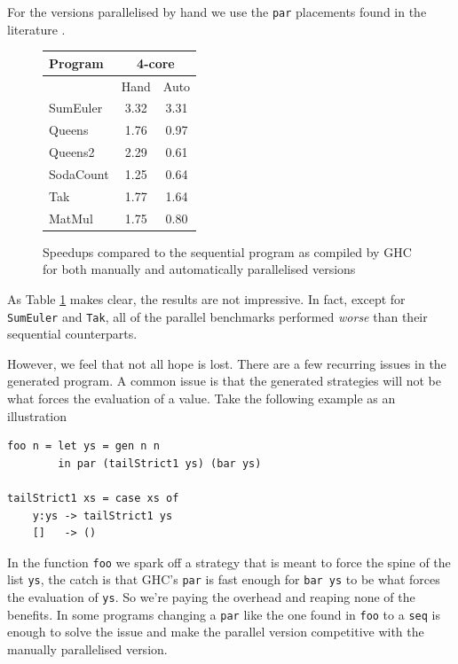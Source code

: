 For the versions parallelised by hand we use the \verb-par- placements found
in the literature \citep{vGMachine, runciman1994profiling}.

\begin{figure}[ht]
\centering
  \begin{tabular}{ |l||c c| }
    \hline
    Program & \multicolumn{2}{c|}{4-core} \\
    \hline
            & Hand   & Auto         \\
    \hline
    SumEuler  & 3.32    & 3.31      \\
    Queens    & 1.76    & 0.97      \\
    Queens2   & 2.29    & 0.61     \\
    SodaCount & 1.25    & 0.64      \\
    Tak       & 1.77    & 1.64      \\
    MatMul    & 1.75    & 0.80      \\
    \hline
  \end{tabular}
\caption{Speedups compared to the sequential program as compiled by GHC for both
         manually and automatically parallelised versions}
\label{tableGHC}
\end{figure}

As Table \ref{tableGHC} makes clear, the results are not impressive. In fact,
except for \verb-SumEuler- and \verb-Tak-, all of the parallel benchmarks
performed \emph{worse} than their sequential counterparts.

However, we feel that not all hope is lost. There are a few recurring issues in
the generated program. A common issue is that the generated strategies will not
be what forces the evaluation of a value. Take the following example as an
illustration

\begin{verbatim}
foo n = let ys = gen n n
        in par (tailStrict1 ys) (bar ys)

tailStrict1 xs = case xs of
    y:ys -> tailStrict1 ys
    []   -> ()
\end{verbatim}

In the function \verb-foo- we spark off a strategy that is meant to force the
spine of the list \verb-ys-, the catch is that GHC's \verb-par- is fast enough
for \verb-bar ys- to be what forces the evaluation of \verb-ys-. So we're
paying the overhead and reaping none of the benefits. In some programs changing
a \verb-par- like the one found in \verb-foo- to a \verb-seq- is enough to solve the
issue and make the parallel version competitive with the manually parallelised version.



